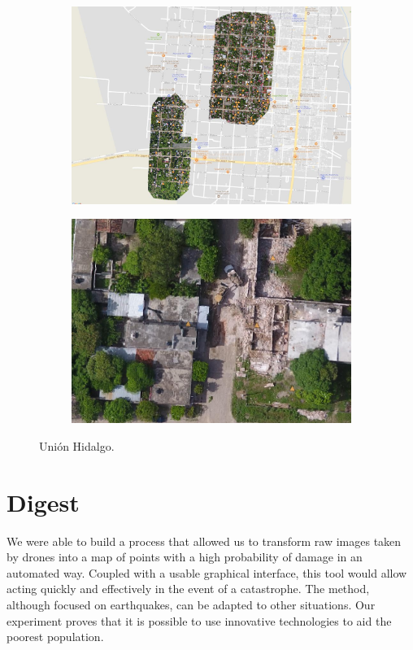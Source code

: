 \begin{figure}[!h]
  \centering
    \begin{subfigure}{.9\textwidth}
        \includegraphics[width=\textwidth]{images/union-ortho.jpg}
    \end{subfigure}
    \begin{subfigure}{.9\textwidth}
        \includegraphics[width=\textwidth]{images/union-example.jpg}
    \end{subfigure}
  \caption{Uni\'on Hidalgo.}
  \label{fig:union-gis}
\end{figure}

\section{Digest}

We were able to build a process that allowed us to transform raw images taken by drones into a map of points with a high probability of damage in an automated way. Coupled with a usable graphical interface, this tool would allow acting quickly and effectively in the event of a catastrophe. The method, although focused on earthquakes, can be adapted to other situations. Our experiment proves that it is possible to use innovative technologies to aid the poorest population.

